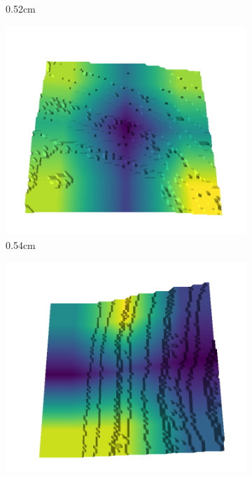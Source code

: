 \begin{figure}[H]
\begin{subfigure}[b]{0.192\linewidth}
    \caption{0.52cm}
    \label{fig : quarry-best-10}
    \end{subfigure}
    \begin{subfigure}[b]{0.192\linewidth}
    \includegraphics[width=\linewidth]{../img/5/quarry/best/54-patch-3d-majavi-colormap-100.png}
    \caption{0.54cm}
    \label{fig : quarry-best-11}
    \end{subfigure}
    \begin{subfigure}[b]{0.192\linewidth}
    \includegraphics[width=\linewidth]{../img/5/quarry/best/56-patch-3d-majavi-colormap-110.png}

\end{subfigure}
\end{figure}
